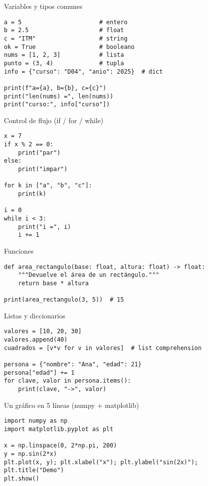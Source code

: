 \documentclass[aspectratio=169,professionalfonts]{beamer}
\begin{document}
\begin{frame}[fragile]{Variables y tipos comunes}
\begin{verbatim}
a = 5                      # entero
b = 2.5                    # float
c = "ITM"                  # string
ok = True                  # booleano
nums = [1, 2, 3]           # lista
punto = (3, 4)             # tupla
info = {"curso": "D04", "anio": 2025}  # dict

print(f"a={a}, b={b}, c={c}")
print("len(nums) =", len(nums))
print("curso:", info["curso"])
\end{verbatim}
\end{frame}

\begin{frame}[fragile]{Control de flujo (if / for / while)}
\begin{verbatim}
x = 7
if x % 2 == 0:
    print("par")
else:
    print("impar")

for k in ["a", "b", "c"]:
    print(k)

i = 0
while i < 3:
    print("i =", i)
    i += 1
\end{verbatim}
\end{frame}

\begin{frame}[fragile]{Funciones}
\begin{verbatim}
def area_rectangulo(base: float, altura: float) -> float:
    """Devuelve el área de un rectángulo."""
    return base * altura

print(area_rectangulo(3, 5))  # 15
\end{verbatim}
\end{frame}

\begin{frame}[fragile]{Listas y diccionarios}
\begin{verbatim}
valores = [10, 20, 30]
valores.append(40)
cuadrados = [v*v for v in valores]  # list comprehension

persona = {"nombre": "Ana", "edad": 21}
persona["edad"] += 1
for clave, valor in persona.items():
    print(clave, "->", valor)
\end{verbatim}
\end{frame}

\begin{frame}[fragile]{Un gráfico en 5 líneas (numpy + matplotlib)}
\begin{verbatim}
import numpy as np
import matplotlib.pyplot as plt

x = np.linspace(0, 2*np.pi, 200)
y = np.sin(2*x)
plt.plot(x, y); plt.xlabel("x"); plt.ylabel("sin(2x)"); plt.title("Demo")
plt.show()
\end{verbatim}
\end{frame}
\end{document}
